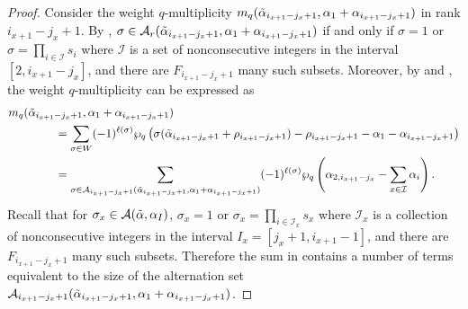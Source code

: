 \documentclass[10pt]{article}
\newcommand{\hr}[0]{\Tilde{\alpha}}
\newcommand{\newmu}[0]{\alpha_I}
\newcommand{\thealtset}[0]{\mathcal{A}(\hr,\newmu)}
\newcommand{\qpartition}[1]{\wp_q\left(#1\right)}
\begin{document}
\begin{proof}
    Consider the weight $q$-multiplicity $m_q(\hr_{i_{x+1}-j_x+1},\alpha_1+\alpha_{i_{x+1}-j_x+1})$ in rank $i_{x+1}-j_x+1$.
    By , $\sigma\in\mathcal{A}_r(\hr_{i_{x+1}-j_x+1},\alpha_1+\alpha_{i_{x+1}-j_x+1})$ if and only if $\sigma=1$ or $\sigma=\prod_{i\in\mathcal{I}}s_i$ where $\mathcal{I}$ is a set of nonconsecutive integers in the interval $[2,i_{x+1}-j_x]$, and there are $F_{i_{x+1}-j_x+1}$ many such subsets. Moreover, by  and , the weight $q$-multiplicity can be expressed as 
    \begin{align}
        &m_q(\hr_{i_{x+1}-j_x+1},\alpha_1+\alpha_{i_{x+1}-j_x+1}) \notag\\
        &\qquad \qquad= \sum_{\sigma\in W}(-1)^{\ell(\sigma)}\qpartition{\sigma(\hr_{i_{x+1}-j_x+1}+\rho_{i_{x+1}-j_x+1})-\rho_{i_{x+1}-j_x+1}-\alpha_1-\alpha_{i_{x+1}-j_x+1}}\notag \\
        &\qquad \qquad= \sum_{\sigma\in\mathcal{A}_{i_{x+1}-j_x+1}(\hr_{i_{x+1}-j_x+1},\alpha_1+\alpha_{i_{x+1}-j_x+1})} (-1)^{\ell(\sigma)}\qpartition{\alpha_{2,i_{x+1}-j_x}-\sum_{x\in\mathcal{I}}\alpha_i}.\label{weight q mult in pay the rent}
    \end{align} 
    Recall that for $\sigma_x\in\thealtset$, $\sigma_x=1$ or $\sigma_x=\prod_{i\in\mathcal{I}_x}s_x$ where $\mathcal{I}_x$ is a collection of nonconsecutive integers in the interval $I_x=[j_x+1,i_{x+1}-1]$, and there are $F_{i_{x+1}-j_x+1}$ many such subsets. 
    Therefore the sum in  contains a number of terms equivalent to the size of the alternation set $\mathcal{A}_{i_{x+1}-j_x+1}(\hr_{i_{x+1}-j_x+1},\alpha_1+\alpha_{i_{x+1}-j_x+1})$.


\end{proof}
\end{document}

